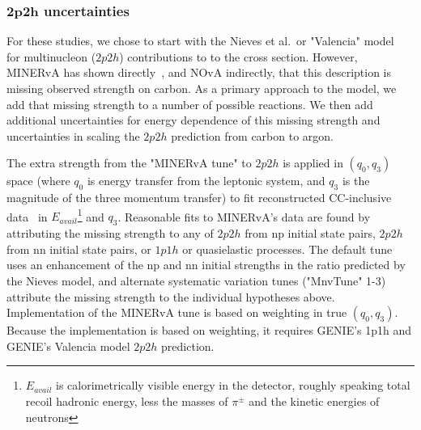 \subsubsection{$\boldsymbol{2p2h}$ uncertainties}
For these studies, we chose to start with the Nieves et al.\ or "Valencia" model~\cite{nieves1,nieves2} for multinucleon ($2p2h$) contributions to to the cross section.  However, MINERvA has shown directly~\cite{Rodrigues:2015hik}, and NOvA indirectly, that this description is missing observed strength on carbon.  As a primary approach to the model, we add that missing strength to a number of possible reactions.  We then add additional uncertainties for energy dependence of this missing strength and uncertainties in scaling the $2p2h$ prediction from carbon to argon.

The extra strength from the "MINERvA tune" to $2p2h$ is applied in $(q_0,q_3)$ space (where $q_0$ is energy transfer from the leptonic system, and $q_3$ is the magnitude of the three momentum transfer) to fit reconstructed \minerva CC-inclusive data~\cite{Rodrigues:2015hik} in $E_{avail}$\footnote{$E_{avail}$ is calorimetrically visible energy in the detector, roughly speaking total recoil hadronic energy, less the masses of $\pi^\pm$ and the kinetic energies of neutrons} and $q_3$.  Reasonable fits to MINERvA's data are found by attributing the missing strength to any of $2p2h$ from np initial state pairs, $2p2h$ from nn initial state pairs, or $1p1h$ or quasielastic processes.  The default tune uses an enhancement of the np and nn initial strengths in the ratio predicted by the Nieves model, and alternate systematic variation tunes ("MnvTune" 1-3) attribute the missing strength to the individual hypotheses above.
Implementation of the MINERvA tune is based on weighting in true $(q_0,q_3)$. Because the implementation is based on weighting, it requires GENIE's 1p1h and GENIE's Valencia model $2p2h$ prediction.  



